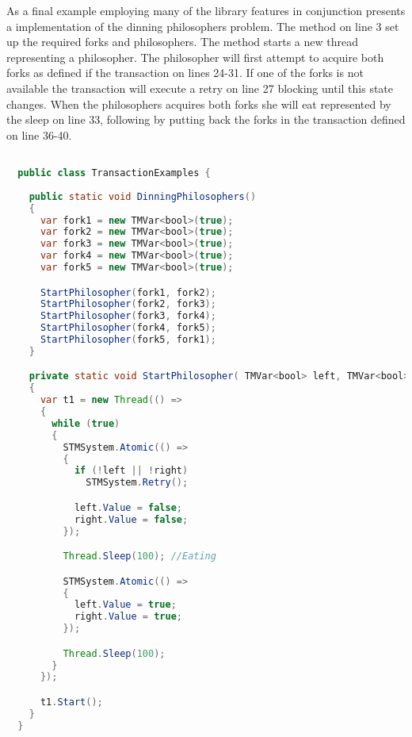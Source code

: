 As a final example employing many of the library features in conjunction  presents a implementation of the dinning philosophers problem\cite[p. 673]{hoare1978communicating}.  The  method on line 3 set up the required forks and philosophers. The  method starts a new thread representing a philosopher. The philosopher will first attempt to acquire both forks as defined if the transaction on lines 24-31. If one of the forks is not available the transaction will execute a retry on line 27 blocking until this state changes. When the philosophers acquires both forks she will eat represented by the sleep on line 33, following by putting back the forks in the transaction defined on line 36-40.
\begin{lstlisting}[label=lst:library_dinning,
  caption={Library Dinning Philosophers},
  language=Java,  
  showspaces=false,
  showtabs=false,
  breaklines=true,
  showstringspaces=false,
  breakatwhitespace=true,
  commentstyle=\color{greencomments},
  keywordstyle=\color{bluekeywords},
  stringstyle=\color{redstrings},
  morekeywords={atomic, retry, orElse, var, get, set}]  % Start your code-block

  public class TransactionExamples {
    
    public static void DinningPhilosophers()
    {
      var fork1 = new TMVar<bool>(true);
      var fork2 = new TMVar<bool>(true);
      var fork3 = new TMVar<bool>(true);
      var fork4 = new TMVar<bool>(true);
      var fork5 = new TMVar<bool>(true);

      StartPhilosopher(fork1, fork2);
      StartPhilosopher(fork2, fork3);
      StartPhilosopher(fork3, fork4);
      StartPhilosopher(fork4, fork5);
      StartPhilosopher(fork5, fork1);
    }

    private static void StartPhilosopher( TMVar<bool> left, TMVar<bool> right)
    {
      var t1 = new Thread(() =>
      {
        while (true)
        {
          STMSystem.Atomic(() =>
          {
            if (!left || !right)
              STMSystem.Retry();

            left.Value = false;
            right.Value = false;
          });

          Thread.Sleep(100); //Eating

          STMSystem.Atomic(() =>
          {
            left.Value = true;
            right.Value = true;
          });

          Thread.Sleep(100);
        }
      });

      t1.Start();
    }
  }
\end{lstlisting}

